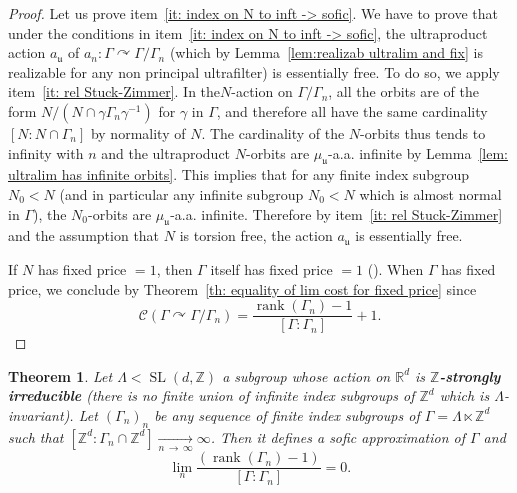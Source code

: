 \documentclass[10pt]{amsart}
\newtheorem{theo}[cdrthm]{Theorem}
\theoremstyle{definition}
\newcommand{\defin}[1]{\textbf{\emph{#1}}}
\newcommand{\Rmath}{\mathbb{R}}
\newcommand{\Zmath}{\mathbb{Z}}
\newcommand{\acting}{\curvearrowright}
\newcommand{\cost}{\mathcal{C}}
\DeclareMathOperator{\rank}{rank}
\DeclareMathOperator{\SL}{SL}
\newcommand{\ul}{\mathfrak{u}}
\newcommand*{\MK}{\mkern 2mu}
\begin{document}
\begin{proof}
Let us prove item~\eqref{it: index on N to inft -> sofic}. We have to prove that under the conditions in item~\eqref{it: index on N to inft -> sofic}, the ultraproduct action $a_\ul$ of $a_n:\Gamma\acting \Gamma/\Gamma_n$ (which by Lemma~\ref{lem:realizab ultralim and fix} is realizable for any non principal ultrafilter) is essentially free. To do so, we apply item~\eqref{it: rel Stuck-Zimmer}. In the\linebreak$N$-action on $\Gamma/\Gamma_n$, all the orbits are of the form $N/(N\cap \gamma \Gamma_n \gamma^{-1})$ for $\gamma$ in $\Gamma$, and therefore all have the same cardinality $[N:N\cap \Gamma_n]$ by normality of $N$. The cardinality of the $N$-orbits thus tends to infinity with $n$ and the ultraproduct $N$-orbits are $\mu_{\ul}$-a.a. infinite by Lemma~\ref{lem: ultralim has infinite orbits}. This implies that for any finite index subgroup $N_0 <N$ (and in particular any infinite subgroup $N_0<N$ which is almost normal in $\Gamma$), the $N_0$-orbits are $\mu_{\ul}$-a.a. infinite. Therefore by item~\eqref{it: rel Stuck-Zimmer} and the assumption that $N$ is torsion free, the action $a_\ul$ is essentially free.

If $N$ has fixed price $=1$, then $\Gamma$ itself has fixed price $=1$ (\cite[Critère~VI.24$\MK$(2)]{Gab-cost}). When $\Gamma$ has fixed price, we conclude by Theorem~\ref{th: equality of lim cost for fixed price} since
\[
\cost(\Gamma\acting \Gamma/\Gamma_n)=\frac{\rank (\Gamma_n)-1 }{ [\Gamma:\Gamma_n]}+1.
\]
\end{proof}


\begin{theo}\label{th: SLd rel Stuck-Zimmer}
Let $\Lambda<\SL(d,\Zmath)$ a subgroup whose action on $\Rmath^d$ is\linebreak
\defin{$\Zmath$-strongly irreducible} (there is no finite union of infinite index subgroups of $\Zmath^d$ which is $\Lambda$-invariant). Let $(\Gamma_n)_n$ be any sequence of finite index subgroups of $\Gamma=\Lambda\ltimes \Zmath^d$ such that $[\Zmath^d:\Gamma_n\cap \Zmath^d]\underset{n\,\to \,\infty}{\longrightarrow}\infty$. Then it defines a sofic approximation of $\Gamma$ and
\begin{equation}
\lim_{n}
\frac{\left(\rank (\Gamma_n)-1\right)}{ [\Gamma:\Gamma_n]}=0.
\end{equation}
\end{theo}
\end{document}
